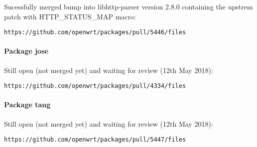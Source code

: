 Sucessfully merged bump into libhttp-parser version 2.8.0 containing the upstrem patch with HTTP\_STATUS\_MAP macro:
\begin{lstlisting}[columns=fixed,basicstyle=\ttfamily\footnotesize,tabsize=4,backgroundcolor=\color{yellow!10}]
https://github.com/openwrt/packages/pull/5446/files
\end{lstlisting}


\paragraph{Package jose}

Still open (not merged yet) and waiting for review (12th May 2018):
\begin{lstlisting}[columns=fixed,basicstyle=\ttfamily\footnotesize,tabsize=4,backgroundcolor=\color{yellow!10}]
https://github.com/openwrt/packages/pull/4334/files
\end{lstlisting}


\paragraph{Package tang}
Still open (not merged yet) and waiting for review (12th May 2018):
\begin{lstlisting}[columns=fixed,basicstyle=\ttfamily\footnotesize,tabsize=4,backgroundcolor=\color{yellow!10}]
https://github.com/openwrt/packages/pull/5447/files
\end{lstlisting}
